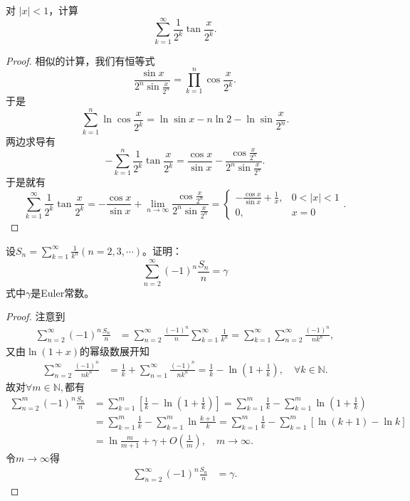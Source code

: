 \documentclass[../../main.tex]{subfiles}
\begin{document}
\begin{example}
对 \(|x| < 1\)，计算
\[
\sum_{k=1}^{\infty} \frac{1}{2^k} \tan \frac{x}{2^k}.
\]
\end{example}
\begin{proof}
相似的计算，我们有恒等式
\[
\frac{\sin x}{2^n \sin \frac{x}{2^n}} = \prod_{k=1}^{n} \cos \frac{x}{2^k}.
\]
于是
\[
\sum_{k=1}^{n} \ln \cos \frac{x}{2^k}=\ln \sin x - n \ln 2 - \ln \sin \frac{x}{2^n}.
\]
两边求导有
\[
- \sum_{k=1}^{n} \frac{1}{2^k} \tan \frac{x}{2^k} = \frac{\cos x}{\sin x} - \frac{\cos \frac{x}{2^n}}{2^n \sin \frac{x}{2^n}}.
\]
于是就有
\[
\sum_{k=1}^{\infty} \frac{1}{2^k} \tan \frac{x}{2^k} = - \frac{\cos x}{\sin x} + \lim_{n \to \infty} \frac{\cos \frac{x}{2^n}}{2^n \sin \frac{x}{2^n}} = 
\begin{cases} 
- \frac{\cos x}{\sin x} + \frac{1}{x}, & 0 < |x| < 1 \\
0, & x = 0 
\end{cases}.
\]

\end{proof}

\begin{example}
设\(S_{n}=\sum_{k = 1}^{\infty}\frac{1}{k^{n}}(n = 2,3,\cdots)\)。证明：
\[
\sum_{n = 2}^{\infty}(-1)^{n}\frac{S_{n}}{n}=\gamma
\]
式中\(\gamma\)是Euler常数。
\end{example}
\begin{proof}
注意到
\begin{align*}
\sum_{n=2}^{\infty}{\left( -1 \right) ^n\frac{S_n}{n}}&=\sum_{n=2}^{\infty}{\frac{\left( -1 \right) ^n}{n}\sum_{k=1}^{\infty}{\frac{1}{k^n}}}=\sum_{k=1}^{\infty}{\sum_{n=2}^{\infty}{\frac{\left( -1 \right) ^n}{nk^n}}},
\end{align*}
又由$\ln \left( 1+x \right)$的幂级数展开知
\begin{align*}
\sum_{n=2}^{\infty}{\frac{\left( -1 \right) ^n}{nk^n}}&=\frac{1}{k}+\sum_{n=1}^{\infty}{\frac{\left( -1 \right) ^n}{nk^n}}=\frac{1}{k}-\ln \left( 1+\frac{1}{k} \right) ,\quad \forall k\in \mathbb{N} .
\end{align*}
故对$\forall m\in \mathbb{N} ,$都有
\begin{align*}
\sum_{n=2}^m{\left( -1 \right) ^n\frac{S_n}{n}}&=\sum_{k=1}^m{\left[ \frac{1}{k}-\ln \left( 1+\frac{1}{k} \right) \right]}=\sum_{k=1}^m{\frac{1}{k}}-\sum_{k=1}^m{\ln \left( 1+\frac{1}{k} \right)}\\
&=\sum_{k=1}^m{\frac{1}{k}}-\sum_{k=1}^m{\ln \frac{k+1}{k}}=\sum_{k=1}^m{\frac{1}{k}}-\sum_{k=1}^m{\left[ \ln \left( k+1 \right) -\ln k \right]}\\
&=\ln \frac{m}{m+1}+\gamma +O\left( \frac{1}{m} \right) ,\quad m\rightarrow \infty .
\end{align*}
令$m\rightarrow \infty$得
\begin{align*}
\sum_{n=2}^{\infty}{\left( -1 \right) ^n\frac{S_n}{n}}&=\gamma .
\end{align*}

\end{proof}
\end{document}
